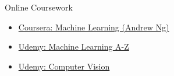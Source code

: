 {\large\color{emphasis}Online Coursework\par}
\smallskip
\begin{itemize}
\item \href{https://www.coursera.org/learn/machine-learning}{Coursera: Machine Learning (Andrew Ng)}
\item \href{https://www.udemy.com/machinelearning}{Udemy: Machine Learning A-Z}
\item \href{https://www.udemy.com/master-computer-vision-with-opencv-in-python/}{Udemy: Computer Vision}
\end{itemize}

